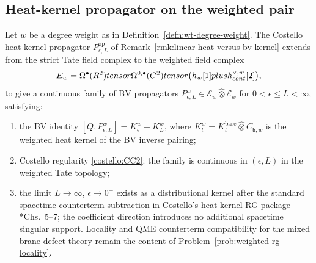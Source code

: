 \subsection*{Heat-kernel propagator on the weighted pair}

\begin{prop}\label{prop:wt-propagator-extends}
  Let $w$ be a degree weight as in
  Definition~\ref{defn:wt-degree-weight}. The Costello heat-kernel
  propagator $P_{\epsilon,L}^{\mathrm{op}}$ of
  Remark~\ref{rmk:linear-heat-versus-bv-kernel} extends from the
  strict Tate field complex to the weighted field complex
  \begin{equation}\label{eq:wt-field-complex}
    E_w=\Omega^\bullet(R^2)tensor
      \Omega^{0,\bullet}(C^2)tensor
      \bigl(h_w[1]plus
      h^{\vee,w}_{cont}[2]\bigr),
  \end{equation}
  to give a continuous family of BV propagators
  $P_{\epsilon,L}^{w}\in\mathcal E_w\widehat\otimes\mathcal E_w$ for
  $0<\epsilon\leq L<\infty$, satisfying:
  \begin{enumerate}[label=(\arabic*)]
    \item the BV identity
      $[Q,P_{\epsilon,L}^{w}]=K_\epsilon^{w}-K_L^{w}$, where
      $K_t^{w}=K_t^{\mathrm{base}}\widehat\otimes C_{\mathfrak h,w}$
      is the weighted heat kernel of the BV inverse pairing;
    \item Costello regularity \ref{costello:CC2}: the family is
      continuous in $(\epsilon,L)$ in the weighted Tate topology;
    \item the limit $L\to\infty$, $\epsilon\to0^+$ exists as a
      distributional kernel after the standard spacetime counterterm
      subtraction in Costello's heat-kernel RG package
      \cite{costello-renormalization}*{Chs.~5--7}; the coefficient
      direction introduces no additional spacetime singular support.
      Locality and QME counterterm compatibility for the mixed
      brane-defect theory remain the content of
      Problem~\ref{prob:weighted-rg-locality}.
  \end{enumerate}
\end{prop}

